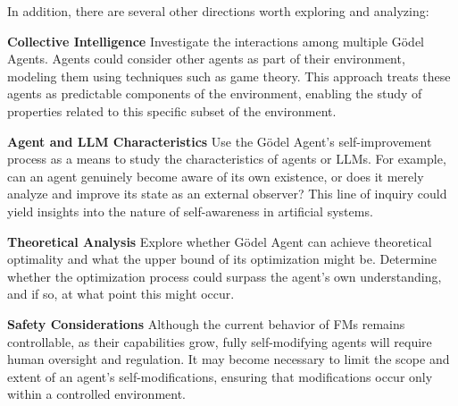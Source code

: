 \documentclass[11pt]{article}
\newcommand{\godel}{G\"odel\xspace}
\newcommand{\framework}{Gödel Agent\xspace}
\begin{document}
In addition, there are several other directions worth exploring and analyzing:

\noindent\textbf{Collective Intelligence} \quad Investigate the interactions among multiple \godel Agents. Agents could consider other agents as part of their environment, modeling them using techniques such as game theory. This approach treats these agents as predictable components of the environment, enabling the study of properties related to this specific subset of the environment. 

\noindent\textbf{Agent and LLM Characteristics} \quad Use the \framework{}’s self-improvement process as a means to study the characteristics of agents or LLMs. For example, can an agent genuinely become aware of its own existence, or does it merely analyze and improve its state as an external observer? 
This line of inquiry could yield insights into the nature of self-awareness in artificial systems.

\noindent\textbf{Theoretical Analysis} \quad Explore whether \framework{} can achieve theoretical optimality and what the upper bound of its optimization might be. Determine whether the optimization process could surpass the agent’s own understanding, and if so, at what point this might occur.

\noindent\textbf{Safety Considerations} \quad Although the current behavior of FMs remains controllable, as their capabilities grow, fully self-modifying agents will require human oversight and regulation. It may become necessary to limit the scope and extent of an agent's self-modifications, ensuring that modifications occur only within a controlled environment.



\end{document}
